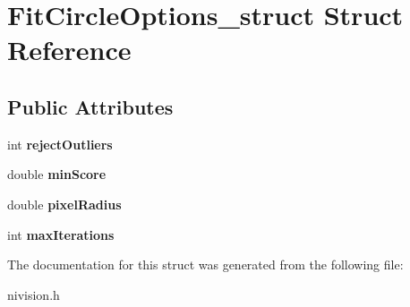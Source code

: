 \hypertarget{structFitCircleOptions__struct}{\section{\-Fit\-Circle\-Options\-\_\-struct \-Struct \-Reference}
\label{structFitCircleOptions__struct}
}
\subsection*{\-Public \-Attributes}
\begin{DoxyCompactItemize}
\item 
\hypertarget{structFitCircleOptions__struct_a3b00fc37ddf07ea961ff7cbf870389bb}{int {\bfseries reject\-Outliers}}\label{structFitCircleOptions__struct_a3b00fc37ddf07ea961ff7cbf870389bb}

\item 
\hypertarget{structFitCircleOptions__struct_adc5b54684c45af2beb0571dcf3d54412}{double {\bfseries min\-Score}}\label{structFitCircleOptions__struct_adc5b54684c45af2beb0571dcf3d54412}

\item 
\hypertarget{structFitCircleOptions__struct_a4111915563a8d163fd6cb485fa89c78e}{double {\bfseries pixel\-Radius}}\label{structFitCircleOptions__struct_a4111915563a8d163fd6cb485fa89c78e}

\item 
\hypertarget{structFitCircleOptions__struct_a91648f278732196069603ba0cc803dad}{int {\bfseries max\-Iterations}}\label{structFitCircleOptions__struct_a91648f278732196069603ba0cc803dad}

\end{DoxyCompactItemize}


\-The documentation for this struct was generated from the following file\-:\begin{DoxyCompactItemize}
\item 
nivision.\-h\end{DoxyCompactItemize}
